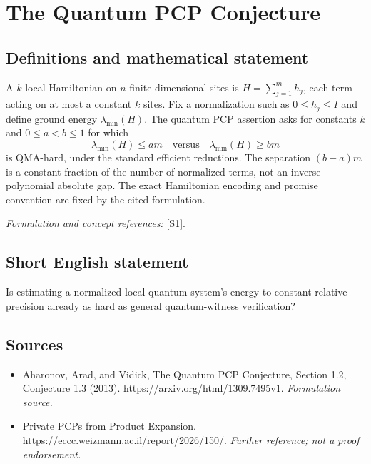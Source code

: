 \documentclass[11pt]{article}
\begin{document}
\section*{\texorpdfstring{The Quantum PCP Conjecture}{The Quantum PCP Conjecture}}\label{statement}
\subsection{Definitions and mathematical statement}
A $k$-local Hamiltonian on $n$ finite-dimensional sites is $H=\sum_{j=1}^m h_j$, each term acting on at most a constant $k$ sites. Fix a normalization such as $0\le h_j\le I$ and define ground energy $\lambda_{\min}(H)$. The quantum PCP assertion asks for constants $k$ and $0\le a<b\le1$ for which
\[
 \lambda_{\min}(H)\le am\quad\text{versus}\quad\lambda_{\min}(H)\ge bm
\]
is QMA-hard, under the standard efficient reductions. The separation $(b-a)m$ is a constant fraction of the number of normalized terms, not an inverse-polynomial absolute gap. The exact Hamiltonian encoding and promise convention are fixed by the cited formulation.
\par\smallskip\textit{Formulation and concept references:} \href{https://arxiv.org/html/1309.7495v1}{[S1]}.

\subsection{Short English statement}
Is estimating a normalized local quantum system's energy to constant relative precision already as hard as general quantum-witness verification?
\subsection{Sources}
\begin{itemize}
\item[S1]Aharonov, Arad, and Vidick, The Quantum PCP Conjecture, Section 1.2, Conjecture 1.3 (2013).
\url{https://arxiv.org/html/1309.7495v1}.
\textit{Formulation source.}
\item[S2]Private PCPs from Product Expansion.
\url{https://eccc.weizmann.ac.il/report/2026/150/}.
\textit{Further reference; not a proof endorsement.}
\end{itemize}
\end{document}
